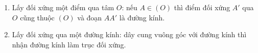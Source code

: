\begin{enumerate}
\item Lấy đối xứng một điểm qua tâm $O$: nếu $A \in (O)$ thì điểm đối xứng $A'$ qua $O$ cũng thuộc $(O)$ và đoạn $AA'$ là đường kính.
\item Lấy đối xứng qua một đường kính: dây cung vuông góc với đường kính thì nhận đường kính làm trục đối xứng.
\end{enumerate}
